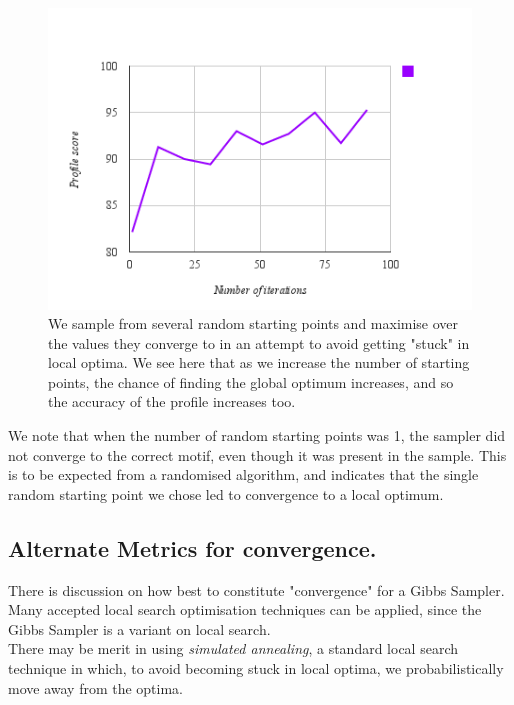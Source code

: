 \documentclass{bioinfo}
\begin{document}
\begin{figure}[h]%
    \centerline{\includegraphics[scale=0.5]{iterations_score.png}}
\caption{We sample from several random starting points and maximise over the values they converge to in an attempt to avoid getting "stuck" in local optima. We see here that as we increase the number of starting points, the chance of finding the global optimum increases, and so the accuracy of the profile increases too.}\label{fig:01}
\end{figure}

We note that when the number of random starting points was 1, the sampler did not converge to the correct motif, even though it was present in the sample. This is to be expected from a randomised algorithm, and indicates that the single random starting point we chose led to convergence to a local optimum.
\subsection{Alternate Metrics for convergence.}
There is discussion on how best to constitute "convergence" for a Gibbs Sampler.
Many accepted local search optimisation techniques can be applied, since the Gibbs Sampler is a variant on local search.\\
There may be merit in using \textit{simulated annealing}, a standard local search technique in which, to avoid becoming stuck in local optima, we probabilistically move away from the optima. \citealp{Finkel}
\end{document}
